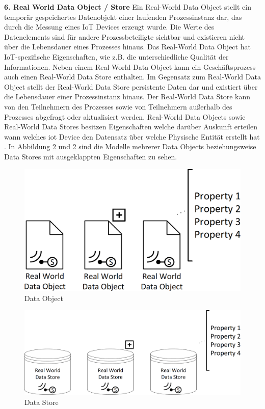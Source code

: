 \documentclass[a4paper, 12pt, twoside, headsepline=true]{scrartcl} %
\begin{document}
\textbf{6. Real World Data Object / Store}
\newline
Ein Real-World Data Object stellt ein temporär gespeichertes Datenobjekt einer laufenden Prozessinstanz dar, das durch die Messung eines IoT Devices erzeugt wurde. Die Werte des Datenelements sind für andere Prozessbeteiligte sichtbar und existieren nicht über die Lebensdauer eines Prozesses hinaus. Das Real-World Data Object hat IoT-spezifische Eigenschaften, wie z.B. die unterschiedliche Qualität der Informationen. Neben einem Real-World Data Object kann ein Geschäftsprozess auch einen Real-World Data Store enthalten. Im Gegensatz zum Real-World Data Object stellt der Real-World Data Store persistente Daten dar und existiert über die Lebensdauer einer Prozessinstanz hinaus. Der Real-World Data Store kann von den Teilnehmern des Prozesses sowie von Teilnehmern außerhalb des Prozesses abgefragt oder aktualisiert werden. Real-World Data Objects sowie Real-World Data Stores besitzen Eigenschaften welche darüber Auskunft erteilen wann welches \ac{iot} Device den Datensatz über welche Physische Entität erstellt hat \cite[S.64-65]{conceptsiotawarepm}. In Abbildung \ref{fig:datastore} und \ref{fig:datastore} sind die Modelle mehrerer Data Objects beziehungsweise Data Stores mit ausgeklappten Eigenschaften zu sehen.

\begin{figure}[H]
	\includegraphics[height=3.5 cm,keepaspectratio,center]{figures/DataObject}
	\caption{Data Object \cite[S.67]{conceptsiotawarepm}}
	\label{fig:dataobject}
\end{figure} 

\begin{figure}[H]
	\includegraphics[height=3 cm,keepaspectratio,center]{figures/DataStore}
	\caption{Data Store \cite[S.67]{conceptsiotawarepm}}
	\label{fig:datastore}
\end{figure} 
\end{document}
